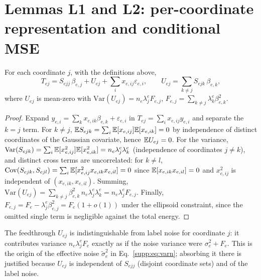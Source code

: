 \section{Lemmas L1 and L2: per-coordinate representation and conditional MSE}
\label{supp:l12}

\begin{lemma}[L1, representation]\label{supp:l1}
For each coordinate $j$, with the definitions above,
\begin{equation}
  T_{ej} = S_{ejj}\,\beta_{e,j} + U_{ej} + \textstyle\sum_i x_{e,ij}\varepsilon_{e,i},
  \qquad U_{ej} = \sum_{k\neq j} S_{ejk}\,\beta_{e,k},
  \label{supp:eq:l1}
\end{equation}
where $U_{ej}$ is mean-zero with $\mathrm{Var}(U_{ej}) = n_e \lambda^e_j F_{e,j}$, $F_{e,j} = \sum_{k\neq j} \lambda^e_k \beta_{e,k}^2$.
\end{lemma}

\begin{proof}
Expand $y_{e,i} = \sum_k x_{e,ik}\beta_{e,k} + \varepsilon_{e,i}$ in $T_{ej} = \sum_i x_{e,ij} y_{e,i}$ and separate the $k = j$ term.
For $k \neq j$, $\mathbb{E} S_{ejk} = \sum_i \mathbb{E}[x_{e,ij}]\mathbb{E}[x_{e,ik}] = 0$ by independence of distinct coordinates of the Gaussian covariate, hence $\mathbb{E} U_{ej} = 0$.
For the variance, $\mathrm{Var}(S_{ejk}) = \sum_i \mathbb{E}[x_{e,ij}^2]\mathbb{E}[x_{e,ik}^2] = n_e \lambda^e_j \lambda^e_k$ (independence of coordinates $j \neq k$), and distinct cross terms are uncorrelated: for $k \neq l$, $\mathrm{Cov}(S_{ejk}, S_{ejl}) = \sum_i \mathbb{E}[x_{e,ij}^2 x_{e,ik} x_{e,il}] = 0$ since $\mathbb{E}[x_{e,ik}x_{e,il}] = 0$ and $x_{e,ij}^2$ is independent of $(x_{e,ik}, x_{e,il})$.
Summing, $\mathrm{Var}(U_{ej}) = \sum_{k\neq j} \beta_{e,k}^2 \, n_e \lambda^e_j \lambda^e_k = n_e \lambda^e_j F_{e,j}$.
Finally, $F_{e,j} = F_e - \lambda^e_j\beta_{e,j}^2 = F_e(1 + o(1))$ under the ellipsoid constraint, since the omitted single term is negligible against the total energy.
\end{proof}

\begin{remark}
The feedthrough $U_{ej}$ is indistinguishable from label noise for coordinate $j$: it contributes variance $n_e\lambda^e_j F_e$ exactly as if the noise variance were $\sigma_e^2 + F_e$.
This is the origin of the effective noise $\tilde\sigma_e^2$ in Eq.~\eqref{supp:eq:varn}; absorbing it there is justified because $U_{ej}$ is independent of $S_{ejj}$ (disjoint coordinate sets) and of the label noise.
\end{remark}


